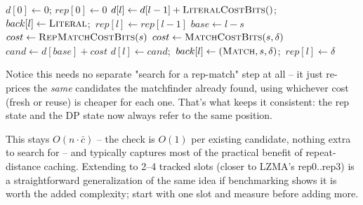 \documentclass[11pt]{article}
\begin{document}
\begin{algorithm}[H]
\caption{Optimal parse with a single repeat-distance slot (corrected)}
\begin{algorithmic}[1]
  \State $d[0] \gets 0$; $rep[0] \gets 0$
    \State $d[l] \gets d[l-1] + \textsc{LiteralCostBits}()$;\ $back[l] \gets \textsc{Literal}$;\ $rep[l] \gets rep[l-1]$
      \State $base \gets l - s$
       
        \State $cost \gets \textsc{RepMatchCostBits}(s)$ 
      \Else
        \State $cost \gets \textsc{MatchCostBits}(s, \delta)$
      \EndIf
      \State $cand \gets d[base] + cost$
        \State $d[l] \gets cand$;\ $back[l] \gets (\textsc{Match}, s, \delta)$;\ $rep[l] \gets \delta$
      \EndIf
    \EndFor
  \EndFor
  \State \Return {}
\EndProcedure
\end{algorithmic}
\end{algorithm}

Notice this needs no separate "search for a rep-match" step at all -- it just re-prices
the \emph{same} candidates the matchfinder already found, using whichever cost (fresh or
reuse) is cheaper for each one. That's what keeps it consistent: the rep state and the
DP state now always refer to the same position.

This stays $O(n \cdot \bar{c})$ -- the check is $O(1)$ per existing candidate, nothing
extra to search for -- and typically captures most of the practical benefit of
repeat-distance caching. Extending to 2--4 tracked slots (closer to LZMA's
rep0..rep3) is a straightforward generalization of the same idea if benchmarking shows
it is worth the added complexity; start with one slot and measure before adding more.
\end{document}
